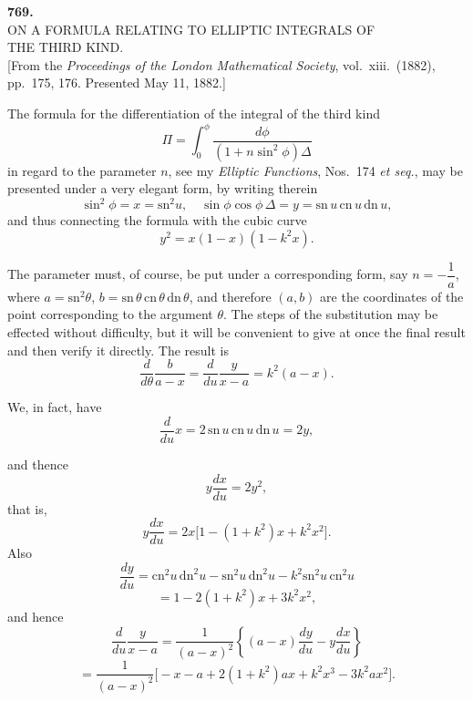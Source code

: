 \documentclass[11pt,a4paper]{article}
\begin{document}
\bigskip


\newpage
\begin{center}
\textbf{769.}\\[4pt]
\textsc{ON A FORMULA RELATING TO ELLIPTIC INTEGRALS OF\\
THE THIRD KIND.}\\[4pt]
[From the \textit{Proceedings of the London Mathematical Society},
vol.\ xiii.\ (1882), pp.\ 175, 176. Presented May 11, 1882.]
\end{center}

\bigskip

\noindent
The formula for the differentiation of the integral of the third kind
\[
  \Pi=\int_{0}^{\phi}\frac{d\phi}{(1+n\sin^{2}\phi)\Delta}
\]
in regard to the parameter $n$, see my \textit{Elliptic Functions},
Nos.~174 \textit{et seq.}, may be presented under a very elegant form,
by writing therein
\[
  \sin^{2}\phi=x=\mathrm{sn}^{2}u,\quad \sin\phi\cos\phi\,\Delta=y=\mathrm{sn}\,u\,\mathrm{cn}\,u\,\mathrm{dn}\,u,
\]
and thus connecting the formula with the cubic curve
\[
  y^{2}=x(1-x)(1-k^{2}x).
\]

The parameter must, of course, be put under a corresponding form, say
$n=-\dfrac{1}{a}$, where $a=\mathrm{sn}^{2}\theta$,
$b=\mathrm{sn}\,\theta\,\mathrm{cn}\,\theta\,\mathrm{dn}\,\theta$, and
therefore $(a,b)$ are the coordinates of the point corresponding to the
argument $\theta$. The steps of the substitution may be effected
without difficulty, but it will be convenient to give at once the final
result and then verify it directly. The result is
\[
  \frac{d}{d\theta}\frac{b}{a-x}=\frac{d}{du}\frac{y}{x-a}=k^{2}(a-x).
\]

We, in fact, have
\[
  \frac{d}{du}x=2\,\mathrm{sn}\,u\,\mathrm{cn}\,u\,\mathrm{dn}\,u=2y,
\]

\newpage
\noindent
and thence
\[
  y\frac{dx}{du}=2y^{2},
\]
that is,
\[
  y\frac{dx}{du}=2x\bigl[1-(1+k^{2})x+k^{2}x^{2}\bigr].
\]
Also
\[
  \frac{dy}{du}=\mathrm{cn}^{2}u\,\mathrm{dn}^{2}u-\mathrm{sn}^{2}u\,\mathrm{dn}^{2}u-k^{2}\mathrm{sn}^{2}u\,\mathrm{cn}^{2}u
\]
\[
  =1-2(1+k^{2})x+3k^{2}x^{2},
\]
and hence
\[
  \frac{d}{du}\frac{y}{x-a}=\frac{1}{(a-x)^{2}}\!\left\{(a-x)\frac{dy}{du}-y\frac{dx}{du}\right\}
\]
\[
  =\frac{1}{(a-x)^{2}}\bigl[-x-a+2(1+k^{2})ax+k^{2}x^{3}-3k^{2}ax^{2}\bigr].
\]
\end{document}
